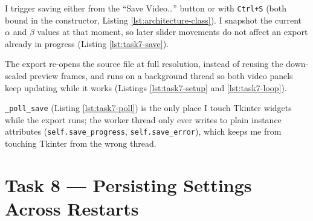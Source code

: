 
I trigger saving either from the ``Save Video\ldots'' button or with
\texttt{Ctrl+S} (both bound in the constructor, Listing
\ref{lst:architecture-class}). I snapshot the current $\alpha$ and
$\beta$ values at that moment, so later slider movements do not
affect an export already in progress (Listing \ref{lst:task7-save}).



The export re-opens the source file at full resolution, instead of
reusing the down-scaled preview frames, and runs on a background
thread so both video panels keep updating while it works (Listings
\ref{lst:task7-setup} and \ref{lst:task7-loop}).





\texttt{\_poll\_save} (Listing \ref{lst:task7-poll}) is the only
place I touch Tkinter widgets while the export runs; the worker
thread only ever writes to plain instance attributes
(\texttt{self.save\_progress}, \texttt{self.save\_error}), which
keeps me from touching Tkinter from the wrong thread.




\section{Task 8 --- Persisting Settings Across Restarts}
\label{sec:task8}

